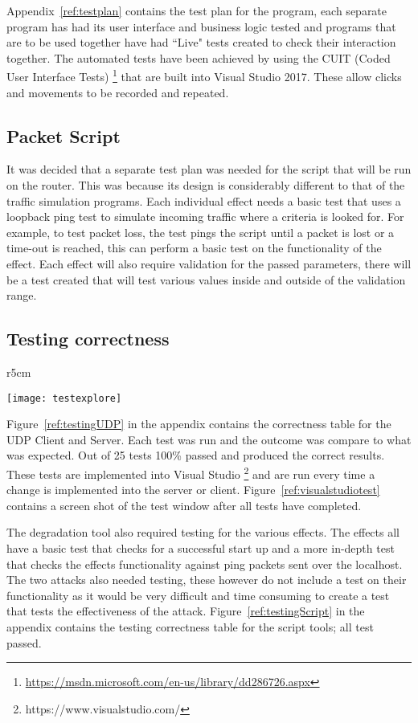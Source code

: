 Appendix~\ref{ref:testplan} contains the test plan for the program, each separate program has had its user interface and business logic tested and programs that are to be used together have had ``Live" tests created to check their interaction together. The automated tests have been achieved by using the CUIT (Coded User Interface Tests) \footnote{\url{https://msdn.microsoft.com/en-us/library/dd286726.aspx}} that are built into Visual Studio 2017. These allow clicks and movements to be recorded and repeated.

\subsection{Packet Script}
It was decided that a separate test plan was needed for the script that will be run on the router. This was because its design is considerably different to that of the traffic simulation programs. Each individual effect needs a basic test that uses a loopback ping test to simulate incoming traffic where a criteria is looked for. For example, to test packet loss, the test pings the script until a packet is lost or a time-out is reached, this can perform a basic test on the functionality of the effect. Each effect will also require validation for the passed parameters, there will be a test created that will test various values inside and outside of the validation range.

\subsection{Testing correctness}
\begin{wrapfigure}{r}{5cm}
\begin{center}
	\texttt{[image: testexplore]}
	\caption{Test explorer}
	\label{ref:visualstudiotest}
\end{center}
\end{wrapfigure}

Figure~\ref{ref:testingUDP} in the appendix contains the correctness table for the UDP Client and Server. Each test was run and the outcome was compare to what was expected. Out of 25 tests 100\% passed and produced the correct results. These tests are implemented into Visual Studio \footnote{https://www.visualstudio.com/} and are run every time a change is implemented into the server or client. Figure~\ref{ref:visualstudiotest} contains a screen shot of the test window after all tests have completed.

The degradation tool also required testing for the various effects. The effects all have a basic test that checks for a successful start up and a more in-depth test that checks the effects functionality against ping packets sent over the localhost. The two attacks also needed testing, these however do not include a test on their functionality as it would be very difficult and time consuming to create a test that tests the effectiveness of the attack. Figure~\ref{ref:testingScript} in the appendix contains the testing correctness table for the script tools; all test passed.

